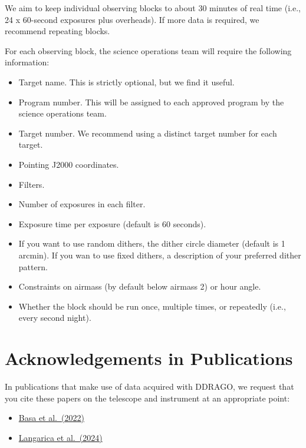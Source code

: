 We aim to keep individual observing blocks to about 30 minutes of real time (i.e., 24 x 60-second exposures plus overheads). If more data is required, we recommend repeating blocks.

For each observing block, the science operations team will require the following information:

\begin{itemize}
\item Target name. This is strictly optional, but we find it useful.
\item Program number. This will be assigned to each approved program by the science operations team.
\item Target number. We recommend using a distinct target number for each target.
\item Pointing J2000 coordinates.
\item Filters.
\item Number of exposures in each filter.
\item Exposure time per exposure (default is 60 seconds).
\item If you want to use random dithers, the dither circle diameter (default is 1 arcmin). If you wan to use fixed dithers, a description of your preferred dither pattern.
\item Constraints on airmass (by default below airmass 2) or hour angle.
\item Whether the block should be run once, multiple times, or repeatedly (i.e., every second night).
\end{itemize}

\section{Acknowledgements in Publications}

In publications that make use of data acquired with DDRAGO, we request that you cite these papers on the telescope and instrument at an appropriate point:

\begin{itemize}
\item \href{https://ui.adsabs.harvard.edu/abs/2022SPIE12182E..1SB/abstract}{Basa et al.\ (2022)}
\item \href{https://ui.adsabs.harvard.edu/abs/2024SPIE13096E..3DL/abstract}{Langarica et al.\ (2024)}

\end{itemize}

